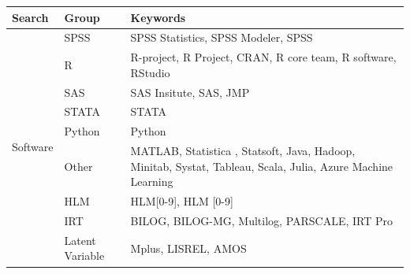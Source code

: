 \documentclass[english,,man]{apa6}
\theoremstyle{definition}
\theoremstyle{definition}
\theoremstyle{definition}
\theoremstyle{remark}
\begin{document}
\begin{table}
\label{tab:searchwords}
\begin{tabularx}{\linewidth}{llX}

\toprule
Search & Group & Keywords \\
\midrule 

\multirow{9}{*}{Software} & SPSS            & SPSS Statistics, SPSS Modeler, SPSS \\
                          & R               & R-project, R Project, CRAN, R core team, R software, RStudio \\
                          & SAS             & SAS Insitute, SAS, JMP  \\
                          & STATA           & STATA          \\
                          & Python          & Python                  \\
                          & Other           & MATLAB, Statistica , Statsoft, Java, Hadoop, Minitab, Systat, Tableau, Scala, Julia, Azure Machine Learning \\
                          & HLM             & HLM[0-9], HLM [0-9]                            \\
                          & IRT             & BILOG, BILOG-MG, Multilog, PARSCALE, IRT Pro        \\
                          & Latent Variable & Mplus, LISREL, AMOS   \\
\midrule


\end{tabularx}
\end{table}
\end{document}

